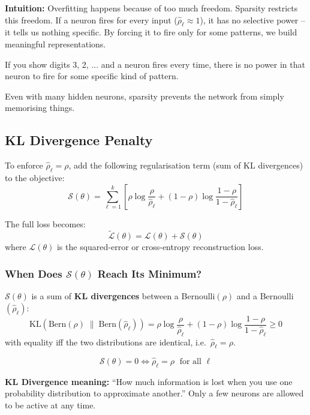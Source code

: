 \documentclass[12pt,a4paper]{article}
\newcommand{\Loss}{\mathcal{L}}
\newcommand{\Reg}{\mathcal{S}}
\begin{document}
\begin{keybox}
\textbf{Intuition:} Overfitting happens because of too much freedom. Sparsity restricts this freedom. If a neuron fires for every input ($\hat{\rho}_\ell \approx 1$), it has no selective power -- it tells us nothing specific. By forcing it to fire only for some patterns, we build meaningful representations.

If you show digits 3, 2, ... and a neuron fires every time, there is no power in that neuron to fire for some specific kind of pattern.

Even with many hidden neurons, sparsity prevents the network from simply memorising things.
\end{keybox}

\subsection{KL Divergence Penalty}

To enforce $\hat{\rho}_\ell = \rho$, add the following regularisation term (sum of KL divergences) to the objective:
\[
\Reg(\theta)
= \sum_{\ell=1}^{k}
  \left[
    \rho\log\frac{\rho}{\hat{\rho}_\ell}
    + (1-\rho)\log\frac{1-\rho}{1-\hat{\rho}_\ell}
  \right]
\]

The full loss becomes:
\[
\tilde{\Loss}(\theta) = \Loss(\theta) + \Reg(\theta)
\]
where $\Loss(\theta)$ is the squared-error or cross-entropy reconstruction loss.

\subsubsection{When Does $\Reg(\theta)$ Reach Its Minimum?}

$\Reg(\theta)$ is a sum of \textbf{KL divergences} between a Bernoulli$(\rho)$ and a Bernoulli$(\hat{\rho}_\ell)$:
\[
\text{KL}(\text{Bern}(\rho)\;\|\;\text{Bern}(\hat{\rho}_\ell))
= \rho\log\frac{\rho}{\hat{\rho}_\ell} + (1-\rho)\log\frac{1-\rho}{1-\hat{\rho}_\ell}
\geq 0
\]
with equality iff the two distributions are identical, i.e.\ $\hat{\rho}_\ell = \rho$.

\[
\Reg(\theta) = 0 \iff \hat{\rho}_\ell = \rho \;\text{ for all } \ell
\]

\begin{notebox}
\textbf{KL Divergence meaning:} ``How much information is lost when you use one probability distribution to approximate another.'' Only a few neurons are allowed to be active at any time.
\end{notebox}
\end{document}
